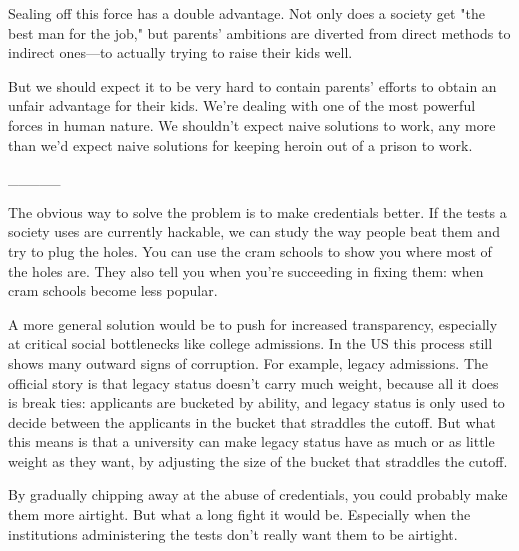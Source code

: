 Sealing off this force has a double
                  advantage. Not only does a society get "the best man for the
                  job," but parents' ambitions are diverted from direct methods
                  to indirect ones---to actually trying to raise their kids
                  well.

But we should expect it to be very hard to
                  contain parents' efforts to obtain an unfair advantage for
                  their kids. We're dealing with one of the most powerful forces
                  in human nature. We shouldn't expect naive solutions to work,
                  any more than we'd expect naive solutions for keeping heroin
                  out of a prison to work.


                  \_\_\_\_\_
                  

The obvious way to solve the problem is to make
                  credentials better. If the tests a society uses are currently
                  hackable, we can study the way people beat them and try to
                  plug the holes. You can use the cram schools to show you where
                  most of the holes are. They also tell you when you're
                  succeeding in fixing them: when cram schools become less
                  popular.

A more general solution would be to push
                  for increased transparency, especially at critical social
                  bottlenecks like college admissions. In the US this process
                  still shows many outward signs of corruption. For example,
                  legacy admissions. The official story is that legacy status
                  doesn't carry much weight, because all it does is break ties:
                  applicants are bucketed by ability, and legacy status is only
                  used to decide between the applicants in the bucket that
                  straddles the cutoff. But what this means is that a university
                  can make legacy status have as much or as little weight as
                  they want, by adjusting the size of the bucket that straddles
                  the cutoff.

By gradually chipping away at the abuse
                  of credentials, you could probably make them more airtight.
                  But what a long fight it would be. Especially when the
                  institutions administering the tests don't really want them to
                  be airtight.


